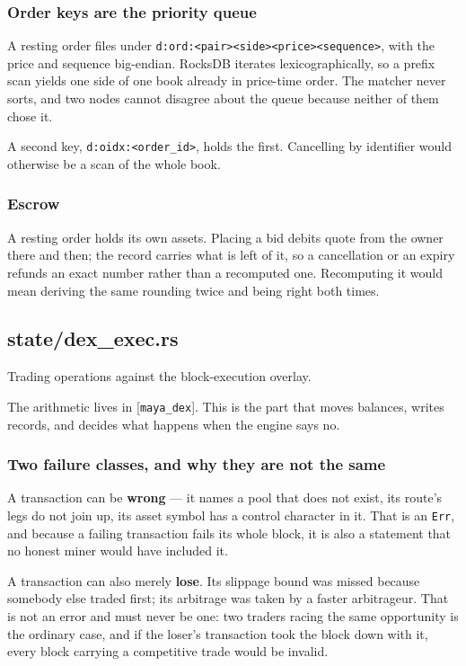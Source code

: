 \documentclass[11pt,a4paper]{article}
\begin{document}
\subsubsection{Order keys are the priority queue}

A resting order files under \texttt{d:ord:<pair><side><price><sequence>}, with the
price and sequence big-endian. RocksDB iterates lexicographically, so a
prefix scan yields one side of one book already in price-time order. The
matcher never sorts, and two nodes cannot disagree about the queue because
neither of them chose it.

A second key, \texttt{d:oidx:<order\_id>}, holds the first. Cancelling by identifier
would otherwise be a scan of the whole book.

\subsubsection{Escrow}

A resting order holds its own assets. Placing a bid debits quote from the
owner there and then; the record carries what is left of it, so a
cancellation or an expiry refunds an exact number rather than a recomputed
one. Recomputing it would mean deriving the same rounding twice and being
right both times.

\subsection{state/dex\_exec.rs}
Trading operations against the block-execution overlay.

The arithmetic lives in [\texttt{maya\_dex}]. This is the part that moves balances,
writes records, and decides what happens when the engine says no.

\subsubsection{Two failure classes, and why they are not the same}

A transaction can be \textbf{wrong} — it names a pool that does not exist, its
route's legs do not join up, its asset symbol has a control character in it.
That is an \texttt{Err}, and because a failing transaction fails its whole block,
it is also a statement that no honest miner would have included it.

A transaction can also merely \textbf{lose}. Its slippage bound was missed
because somebody else traded first; its arbitrage was taken by a faster
arbitrageur. That is not an error and must never be one: two traders racing
the same opportunity is the ordinary case, and if the loser's transaction
took the block down with it, every block carrying a competitive trade would
be invalid.
\end{document}
